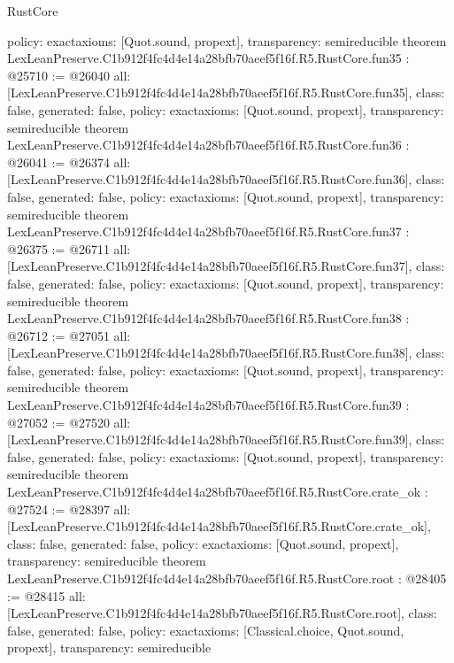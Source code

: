 \begin{lexlean}{RustCore}
\begin{coremodule}
{  policy: exact{axioms: [Quot.sound, propext]},
  transparency: semireducible
}
theorem LexLeanPreserve.C1b912f4fc4d4e14a28bfb70aeef5f16f.R5.RustCore.fun35 : @25710 := @26040 {
  all: [LexLeanPreserve.C1b912f4fc4d4e14a28bfb70aeef5f16f.R5.RustCore.fun35],
  class: false,
  generated: false,
  policy: exact{axioms: [Quot.sound, propext]},
  transparency: semireducible
}
theorem LexLeanPreserve.C1b912f4fc4d4e14a28bfb70aeef5f16f.R5.RustCore.fun36 : @26041 := @26374 {
  all: [LexLeanPreserve.C1b912f4fc4d4e14a28bfb70aeef5f16f.R5.RustCore.fun36],
  class: false,
  generated: false,
  policy: exact{axioms: [Quot.sound, propext]},
  transparency: semireducible
}
theorem LexLeanPreserve.C1b912f4fc4d4e14a28bfb70aeef5f16f.R5.RustCore.fun37 : @26375 := @26711 {
  all: [LexLeanPreserve.C1b912f4fc4d4e14a28bfb70aeef5f16f.R5.RustCore.fun37],
  class: false,
  generated: false,
  policy: exact{axioms: [Quot.sound, propext]},
  transparency: semireducible
}
theorem LexLeanPreserve.C1b912f4fc4d4e14a28bfb70aeef5f16f.R5.RustCore.fun38 : @26712 := @27051 {
  all: [LexLeanPreserve.C1b912f4fc4d4e14a28bfb70aeef5f16f.R5.RustCore.fun38],
  class: false,
  generated: false,
  policy: exact{axioms: [Quot.sound, propext]},
  transparency: semireducible
}
theorem LexLeanPreserve.C1b912f4fc4d4e14a28bfb70aeef5f16f.R5.RustCore.fun39 : @27052 := @27520 {
  all: [LexLeanPreserve.C1b912f4fc4d4e14a28bfb70aeef5f16f.R5.RustCore.fun39],
  class: false,
  generated: false,
  policy: exact{axioms: [Quot.sound, propext]},
  transparency: semireducible
}
theorem LexLeanPreserve.C1b912f4fc4d4e14a28bfb70aeef5f16f.R5.RustCore.crate_ok : @27524 := @28397 {
  all: [LexLeanPreserve.C1b912f4fc4d4e14a28bfb70aeef5f16f.R5.RustCore.crate_ok],
  class: false,
  generated: false,
  policy: exact{axioms: [Quot.sound, propext]},
  transparency: semireducible
}
theorem LexLeanPreserve.C1b912f4fc4d4e14a28bfb70aeef5f16f.R5.RustCore.root : @28405 := @28415 {
  all: [LexLeanPreserve.C1b912f4fc4d4e14a28bfb70aeef5f16f.R5.RustCore.root],
  class: false,
  generated: false,
  policy: exact{axioms: [Classical.choice, Quot.sound, propext]},
  transparency: semireducible
}


\end{coremodule}
\end{lexlean}
